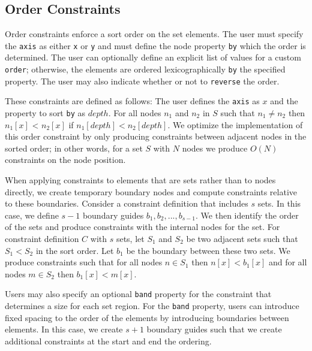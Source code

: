

\subsection{Order Constraints}
Order constraints enforce a sort order on the set elements. The user must 
specify the \texttt{axis} as either \texttt{x} or \texttt{y} and must define
the node property \texttt{by} which the order is determined. 
The user can optionally define an explicit list of values for a custom
\texttt{order}; otherwise, the elements are ordered lexicographically \texttt{by}
the specified property. The user may also indicate whether
or not to \texttt{reverse} the order.

These constraints are defined as follows: The user defines the \texttt{axis} as
$x$ and the property to sort \texttt{by} as $depth$. For all nodes $n_1$ 
and $n_2$ in $S$  such that $n_1 \neq n_2$ then $n_1[x]$ < $n_2[x]$
if $n_1[depth] < n_2[depth]$. We optimize the implementation of this order
constraint by only producing constraints between adjacent nodes in the sorted 
order; in other words, for a set $S$ with $N$ nodes we produce $O(N)$ 
constraints on the node position.

When applying constraints to elements that are sets rather than to nodes
directly, we create temporary boundary nodes and compute constraints relative to
these boundaries. Consider a constraint definition that includes $s$ sets. 
In this case, we define $s-1$ boundary guides $b_1, b_2, ..., b_{s-1}$. We then
identify the order of the sets and produce constraints with the internal
nodes for the set. For constraint definition $C$ with $s$ sets, let $S_1$ and
$S_2$ be two adjacent sets such that $S_1 < S_2$ in the sort order. Let $b_1$ be
the boundary between these two sets. We produce constraints such that for all
nodes $n \in S_1$ then $n[x] < b_1[x]$ and for all nodes $m \in S_2$ then $b_1[x] < m[x]$.

Users may also specify an optional
\texttt{band} property for the constraint that determines a size for each
set region. For the \texttt{band} property, users can introduce fixed spacing
to the order of the elements by introducing boundaries between elements. In
this case, we create $s+1$ boundary guides such that we create additional 
constraints at the start and end the ordering.


